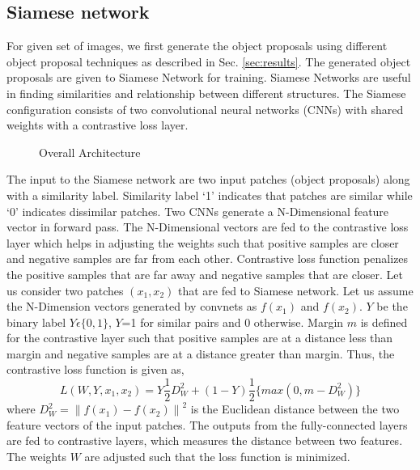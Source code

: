 \documentclass[conference]{IEEEtran}
\begin{document}
\subsection{Siamese network}
For given set of images, we first generate the object proposals using different object proposal techniques as described in Sec. \ref{sec:results}. The generated object proposals are given to Siamese Network for training. Siamese Networks are useful in finding similarities and relationship between different structures. The Siamese configuration consists of two convolutional neural networks (CNNs) with shared weights with a contrastive loss layer. 
\begin{figure*}[ht]
\centering
{}
\caption{Overall Architecture}
\label{fig:block-diagram}
\end{figure*}
The input to the Siamese network are two input patches (object proposals) along with a similarity label. Similarity label `1' indicates that patches are similar while `0' indicates dissimilar patches. Two CNNs generate a N-Dimensional feature vector in forward pass. The N-Dimensional vectors are fed to the contrastive loss layer which helps in adjusting the weights such that positive samples are closer and negative samples are far from each other. Contrastive loss function penalizes the positive samples that are far away and negative samples that are closer. Let us consider two  patches $(x_1,x_2)$ that are fed to Siamese network. Let us assume the N-Dimension vectors generated by convnets as $f(x_1)$ and $f(x_2)$. $Y$ be the binary label $Y\epsilon\{0,1\}$, $Y$=1 for similar pairs and 0 otherwise. Margin $m$ is defined for the contrastive layer such that positive samples are at a distance less than margin and negative samples are at a distance greater than margin. Thus, the contrastive loss function is given as,
\begin{equation}
     \textit{L}(W, Y, x_1,x_2)=Y\frac{1}{2} D_W^2 + (1-Y) \frac{1}{2}\{max(0,m-D_W^2)\}
\end{equation} 
where $D_W^2=\left \| f(x_1)-f(x_2) \right \|^2$ is the Euclidean distance between the two feature vectors of the input patches. The outputs from the fully-connected layers are fed to contrastive layers, which measures the distance between two features. The weights $W$ are adjusted such that the loss function is minimized.
\end{document}
